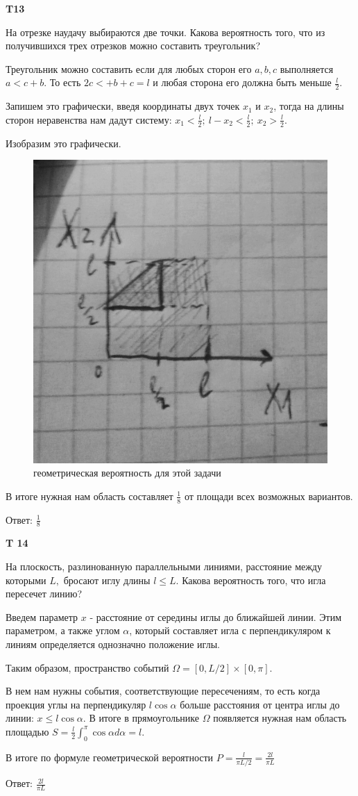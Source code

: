 \documentclass[a4paper,12pt]{article} %
\begin{document}
\begin{example}\textbf{T13}

На отрезке наудачу выбираются две точки. 
Какова вероятность того, что из получившихся трех отрезков можно составить треугольник?

Треугольник можно составить если для любых сторон его $ a,b,c$ выполняется $ a<c+b$. То есть $ 2c<+b+c=l$ и любая сторона его должна быть меньше $\frac{l}{2}$.

Запишем это графически, введя координаты двух точек $ x_1$ и $ x_2$, тогда на длины сторон неравенства нам дадут систему: $ x_1<\frac{l}{2}; \ l-x_2<\frac{l}{2}; \ x_2 > \frac{l}{2}$.

Изобразим это графически.

\begin{figure}[h!]
	\centering
	\includegraphics[width=0.2\linewidth]{t13}
	\caption{геометрическая вероятность для этой задачи}
	\label{fig:t12}
\end{figure}

В итоге нужная нам область составляет $ \frac{1}{8}$ от площади всех возможных вариантов.

Ответ: $ \frac{1}{8}$

\end{example}




\begin{example}\textbf{T 14}

На плоскость, разлинованную параллельными линиями, расстояние между которыми $L,$ бросают иглу длины $l \leqslant L .$ 
Какова вероятность того, что игла пересечет линию?

Введем параметр $x$ - расстояние от середины иглы до ближайшей линии. 
Этим параметром, а также углом $\alpha$, который составляет игла с перпендикуляром к линиям определяется однозначно положение иглы.

Таким образом, пространство событий $ \Omega=[0,L/2]\times[0,\pi]$.

В нем нам нужны события, соответствующие пересечениям, то есть когда проекция углы на перпендикуляр $ l\cos\alpha$ больше расстояния от центра иглы до линии: $ x\le l\cos\alpha$.
В итоге в прямоугольнике $\Omega$ появляется нужная нам область площадью $ S=\frac{l}{2}\int_0^{\pi} \cos\alpha d \alpha=l$.

В итоге по формуле геометрической вероятности $ P=\frac{l}{\pi L/2}=\frac{2l}{\pi L} $


Ответ: $\frac{2l}{\pi L}$

\end{example}
\end{document}

